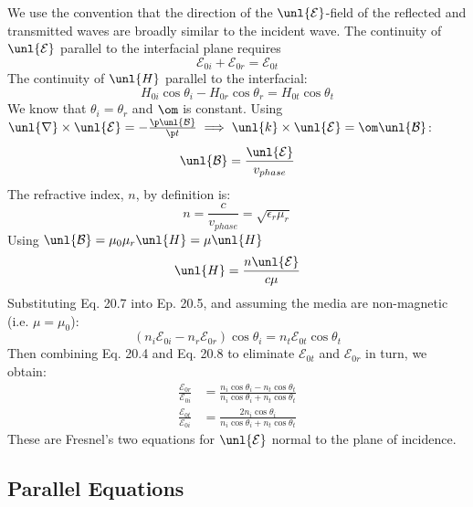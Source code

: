 \documentclass[a4paper, 11pt, normalem]{report}
\renewcommand\E{\mathcal{E}}
\newcommand\uE{\unl{\E}}
\renewcommand\B{\mathcal{B}}
\newcommand\uB{\unl{\B}}
\renewcommand\del{\unl{\nabla}}
\newcommand\vk{\unl{k}}
\newcommand\er{\epsilon_r}
\begin{document}
We use the convention that the direction of the $\uE$-field of the reflected and transmitted waves are broadly similar to the incident wave.
The continuity of $\uE$ parallel to the interfacial plane requires
\begin{equation}
	\E_{0i} + \E_{0r} = \E_{0t}
\end{equation}
The continuity of $\unl{H}$ parallel to the interfacial:
\begin{equation}
	H_{0i}\cos\theta_i - H_{0r}\cos\theta_r = H_{0t}\cos\theta_t
\end{equation}
We know that $\theta_i = \theta_r$ and $\om$ is constant.
Using $\del\times\uE = -\frac{\p\uB}{\p t} \implies \vk\times\uE = \om\uB$:
\begin{equation}
	\uB = \frac{\uE}{v_{phase}}
\end{equation}
The refractive index, $n$, by definition is:
\begin{equation}
	n = \frac{c}{v_{phase}} = \sqrt{\er\mu_r}
\end{equation}
Using $\uB = \mu_0\mu_r\unl{H} = \mu\unl{H}$
\begin{equation}
	\unl{H} = \frac{n\uE}{c\mu}
\end{equation}
Substituting Eq. 20.7 into Ep. 20.5, and assuming the media are non-magnetic (i.e. $\mu = \mu_0$):
\begin{equation}
	(n_i\E_{0i} - n_r\E_{0r})\cos\theta_i = n_t\E_{0t}\cos\theta_t
\end{equation}
Then combining Eq. 20.4 and Eq. 20.8 to eliminate $\E_{0t}$ and $\E_{0r}$ in turn, we obtain:
\begin{align}
	\frac{\E_{0r}}{\E_{0i}} &= \frac{n_i\cos\theta_i - n_t\cos\theta_t}{n_i\cos\theta_i + n_t\cos\theta_t} \\
	\frac{\E_{0t}}{\E_{0i}} &= \frac{2n_i\cos\theta_i}{n_i\cos\theta_i + n_t\cos\theta_t}
\end{align}
These are Fresnel's two equations for $\uE$ normal to the plane of incidence.

\subsection{Parallel Equations}
\end{document}
